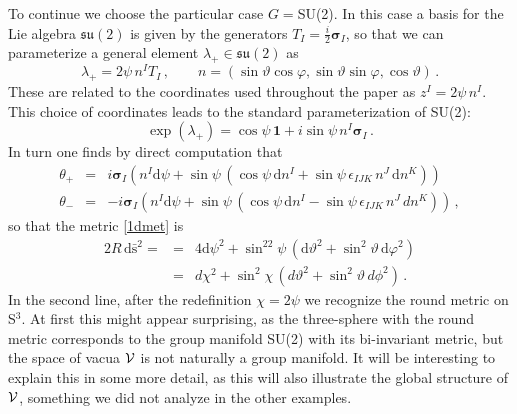 \documentclass[11pt,a4paper]{article}
\def\calv{{\cal V}}
\def\rd{{\mathrm{d}}}
\begin{document}
    To continue we choose the particular case $G=$SU(2). In this case a basis for the Lie algebra $\mathfrak{su}(2)$ is given by the generators $T_I=\frac{i}{2}{\bm \sigma}_I$, so that we can parameterize a general element $\lambda_+\in\mathfrak{su}(2)$ as
    \begin{equation}
    \lambda_+=2\psi\, n^IT_I\,,\qquad n=(\sin\vartheta\cos\varphi,\sin\vartheta\sin\varphi,\cos\vartheta)\,.
    \end{equation} 
    These are related to the coordinates used throughout the paper as $z^I=2\psi\, n^I$. This choice of coordinates leads to the standard parameterization of SU(2):
    \begin{equation}
    \exp(\lambda_+)=\cos\psi\,\mathbf{1}+i\sin\psi\,n^I{\bm \sigma}_I\label{su2}\,.
    \end{equation}
    In turn one finds by direct computation that
    \begin{eqnarray}
    \theta_+&=&i{\bm \sigma}_I\left(n^I\rd\psi+\sin\psi\,(\cos\psi\,\rd n^I+\sin\psi\,\epsilon_{IJK}\,n^J\,\rd n^K)\right)\\
    \theta_-&=&-i{\bm \sigma}_I\left(n^I\rd\psi+\sin\psi\,(\cos\psi\,
    \rd n^I-\sin\psi\,\epsilon_{IJK}\,n^J\,dn^K)\right)\,,
    \end{eqnarray}
    so that the metric \eqref{1dmet} is
    \begin{eqnarray}
    2R\,\rd\bar{\mathrm{s}}^2=&=&4\rd\psi^2+\sin^22\psi\,(\rd\vartheta^2+\sin^2\vartheta\,\rd\varphi^2)\\
    &=&d\chi^2+\sin^2\chi\,(d\vartheta^2+\sin^2\vartheta\,d\phi^2)\label{roundS3}\,.
    \end{eqnarray}
    In the second line, after the redefinition $\chi=2\psi$ we recognize the round metric on S$^3$. At first this might appear surprising, as the three-sphere with the round metric corresponds to the group manifold SU(2) with its bi-invariant metric, but the space of vacua $\calv$ is not naturally a group manifold. It will be interesting to explain this in some more detail, as this will also illustrate the global structure of $\calv$, something we did not analyze in the other examples. 
\end{document}
